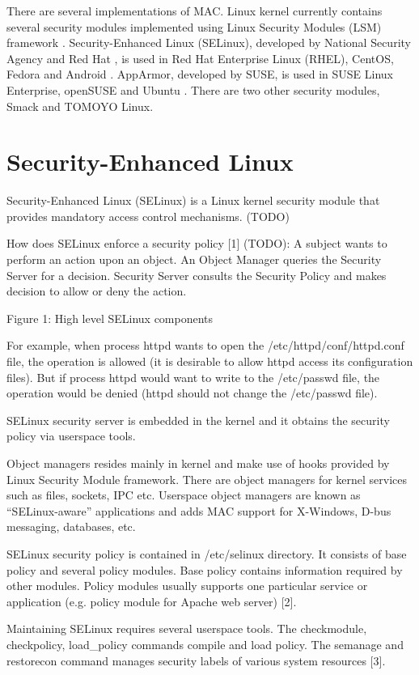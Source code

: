 There are several implementations of MAC. Linux kernel currently contains several security modules implemented using Linux Security Modules (LSM) framework \cite{lsmusage}. Security-Enhanced Linux (SELinux), developed by National Security Agency and Red Hat \cite{selinuxcontr}, is used in Red Hat Enterprise Linux (RHEL), CentOS, Fedora and Android \cite{selinuxguide,selinuxguidefedora,selinuxandroid}. AppArmor, developed by SUSE, is used in SUSE Linux Enterprise, openSUSE and Ubuntu
\cite{apparmor,apparmorubuntu}. There are two other security modules, Smack and TOMOYO Linux.

\section{Security-Enhanced Linux}
Security-Enhanced Linux (SELinux) is a Linux kernel security module that provides mandatory access control mechanisms. (TODO)

How does SELinux enforce a security policy [1] (TODO):
A subject wants to perform an action upon an object.
An Object Manager queries the Security Server for a decision.
Security Server consults the Security Policy and makes decision to allow or deny the action.

Figure 1: High level SELinux components

For example, when process httpd wants to open the /etc/httpd/conf/httpd.conf file, the operation is allowed (it is desirable to allow httpd access its configuration files). But if process httpd would want to write to the /etc/passwd file, the operation would be denied (httpd should not change the /etc/passwd file).

SELinux security server is embedded in the kernel and it obtains the security policy via userspace tools.

Object managers resides mainly in kernel and make use of hooks provided by Linux Security Module framework. There are object managers for kernel services such as files, sockets, IPC etc. Userspace object managers are known as “SELinux-aware” applications and adds MAC support for X-Windows, D-bus messaging, databases, etc.

SELinux security policy is contained in /etc/selinux directory. It consists of base policy and several policy modules. Base policy contains information required by other modules. Policy modules usually supports one particular service or application (e.g. policy module for Apache web server) [2].

Maintaining SELinux requires several userspace tools. The checkmodule, checkpolicy, load\_policy commands compile and load policy. The semanage and restorecon command manages security labels of various system resources [3].

